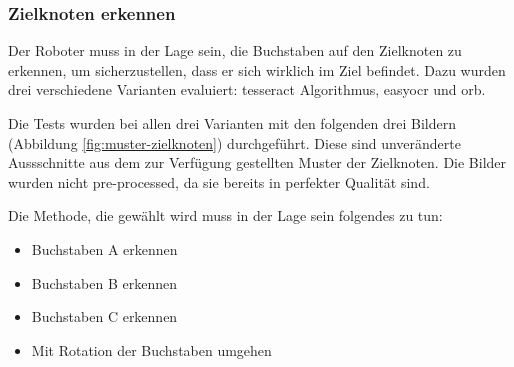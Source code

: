\subsubsection*{Zielknoten erkennen}

Der Roboter muss in der Lage sein, die Buchstaben auf den Zielknoten zu erkennen, um sicherzustellen, dass er sich wirklich im Ziel befindet. Dazu wurden drei verschiedene Varianten evaluiert: \gls{tesseract} Algorithmus, \gls{easyocr} und \acrfull{orb}.

Die Tests wurden bei allen drei Varianten mit den folgenden drei Bildern (Abbildung \ref{fig:muster-zielknoten}) durchgeführt. Diese sind unveränderte Aussschnitte aus dem zur Verfügung gestellten Muster der Zielknoten. Die Bilder wurden nicht pre-processed, da sie bereits in perfekter Qualität sind.

Die Methode, die gewählt wird muss in der Lage sein folgendes zu tun:

\begin{itemize}
    \item Buchstaben A erkennen
    \item Buchstaben B erkennen
    \item Buchstaben C erkennen
    \item Mit Rotation der Buchstaben umgehen
\end{itemize}

